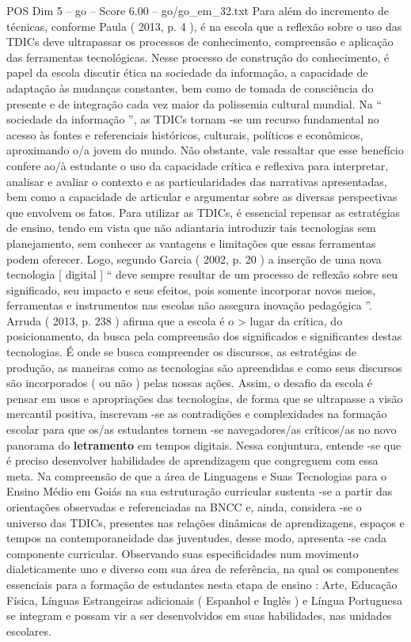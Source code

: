 \begin{textsample}{POS Dim 5 – go – Score 6.00 – go/go\_em\_32.txt}
Para além do incremento de técnicas, conforme Paula ( 2013, p. 4 ), é na escola que a reflexão sobre o uso das TDICs deve ultrapassar os processos de conhecimento, compreensão e aplicação das ferramentas tecnológicas.
Nesse processo de construção do conhecimento, é papel da escola discutir ética na sociedade da informação, a capacidade de adaptação às mudanças constantes, bem como de tomada de consciência do presente e de integração cada vez maior da polissemia cultural mundial.
Na “ sociedade da informação ”, as TDICs tornam -se um recurso fundamental no acesso às fontes e referenciais históricos, culturais, políticos e econômicos, aproximando o/a jovem do mundo.
Não obstante, vale ressaltar que esse benefício confere ao/à estudante o uso da capacidade crítica e reflexiva para interpretar, analisar e avaliar o contexto e as particularidades das narrativas apresentadas, bem como a capacidade de articular e argumentar sobre as diversas perspectivas que envolvem os fatos.
Para utilizar as TDICs, é essencial repensar as estratégias de ensino, tendo em vista que não adiantaria introduzir tais tecnologias sem planejamento, sem conhecer as vantagens e limitações que essas ferramentas podem oferecer.
Logo, segundo Garcia ( 2002, p. 20 ) a inserção de uma nova tecnologia [ digital ] “ deve sempre resultar de um processo de reflexão sobre seu significado, seu impacto e seus efeitos, pois somente incorporar novos meios, ferramentas e instrumentos nas escolas não assegura inovação pedagógica ”.
Arruda ( 2013, p. 238 ) afirma que a escola é o > lugar da crítica, do posicionamento, da busca pela compreensão dos significados e significantes destas tecnologias.
É onde se busca compreender os discursos, as estratégias de produção, as maneiras como as tecnologias são apreendidas e como seus discursos são incorporados ( ou não ) pelas nossas ações.
Assim, o desafio da escola é pensar em usos e apropriações das tecnologias, de forma que se ultrapasse a visão mercantil positiva, inscrevam -se as contradições e complexidades na formação escolar para que os/as estudantes tornem -se navegadores/as críticos/as no novo panorama do \textbf{letramento} em tempos digitais.
Nessa conjuntura, entende -se que é preciso desenvolver habilidades de aprendizagem que congreguem com essa meta.
Na compreensão de que a área de Linguagens e Suas Tecnologias para o Ensino Médio em Goiás na sua estruturação curricular sustenta -se a partir das orientações observadas e referenciadas na BNCC e, ainda, considera -se o universo das TDICs, presentes nas relações dinâmicas de aprendizagens, espaços e tempos na contemporaneidade das juventudes, desse modo, apresenta -se cada componente curricular.
Observando suas especificidades num movimento dialeticamente uno e diverso com sua área de referência, na qual os componentes essenciais para a formação de estudantes nesta etapa de ensino : Arte, Educação Física, Línguas Estrangeiras adicionais ( Espanhol e Inglês ) e Língua Portuguesa se integram e possam vir a ser desenvolvidos em suas habilidades, nas unidades escolares.

\end{textsample}
